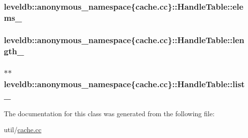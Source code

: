\subsubsection[{elems\+\_\+}]{ leveldb\+::anonymous\+\_\+namespace\{cache.\+cc\}\+::Handle\+Table\+::elems\+\_\+\hspace{0.3cm}{\ttfamily [private]}}\label{classleveldb_1_1anonymous__namespace_02cache_8cc_03_1_1_handle_table_ad8737ca32824eacb122b742accac7143}
\hypertarget{classleveldb_1_1anonymous__namespace_02cache_8cc_03_1_1_handle_table_af00dbaf24e74df0c5ec04dcb6cbcd365}{}
\subsubsection[{length\+\_\+}]{ leveldb\+::anonymous\+\_\+namespace\{cache.\+cc\}\+::Handle\+Table\+::length\+\_\+\hspace{0.3cm}{\ttfamily [private]}}\label{classleveldb_1_1anonymous__namespace_02cache_8cc_03_1_1_handle_table_af00dbaf24e74df0c5ec04dcb6cbcd365}
\hypertarget{classleveldb_1_1anonymous__namespace_02cache_8cc_03_1_1_handle_table_a71b99c884ffe8096482f4c327cfefae2}{}
\subsubsection[{list\+\_\+}]{$\ast$$\ast$ leveldb\+::anonymous\+\_\+namespace\{cache.\+cc\}\+::Handle\+Table\+::list\+\_\+\hspace{0.3cm}{\ttfamily [private]}}\label{classleveldb_1_1anonymous__namespace_02cache_8cc_03_1_1_handle_table_a71b99c884ffe8096482f4c327cfefae2}


The documentation for this class was generated from the following file\+:\begin{DoxyCompactItemize}
\item 
util/\hyperlink{cache_8cc}{cache.\+cc}\end{DoxyCompactItemize}
